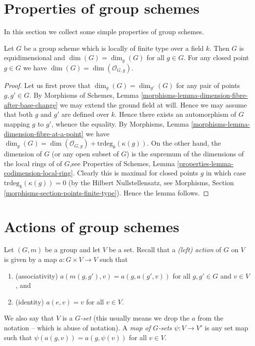 \section{Properties of group schemes}
\label{section-properties-group-schemes}

\noindent
In this section we collect some simple properties of group schemes.

\begin{lemma}
\label{lemma-group-scheme-finite-type-field}
Let $G$ be a group scheme which is locally of finite type over a
field $k$. Then $G$ is equidimensional and
$\dim(G) = \dim_g(G)$ for all $g \in G$.
For any closed point $g \in G$ we have $\dim(G) = \dim(\mathcal{O}_{G, g})$.
\end{lemma}

\begin{proof}
Let us first prove that $\dim_g(G) = \dim_{g'}(G)$ for any
pair of points $g, g' \in G$. By
Morphisms of Schemes,
Lemma \ref{morphisms-lemma-dimension-fibre-after-base-change}
we may extend the ground field at will. Hence we may assume that
both $g$ and $g'$ are defined over $k$. Hence there exists an
automorphism of $G$ mapping $g$ to $g'$, whence the equality.
By
Morphisms, Lemma \ref{morphisms-lemma-dimension-fibre-at-a-point}
we have
$\dim_g(G) = \dim(\mathcal{O}_{G, g}) +
\text{trdeg}_{k}(\kappa(g))$.
On the other hand, the dimension of $G$ (or any open subset of $G$)
is the supremum of the dimensions of the local rings of of $G$,see
Properties of Schemes, Lemma \ref{properties-lemma-codimension-local-ring}.
Clearly this is maximal for closed points $g$ in which case
$\text{trdeg}_{k}(\kappa(g)) = 0$ (by the Hilbert Nullstellensatz, see
Morphisms, Section \ref{morphisms-section-points-finite-type}).
Hence the lemma follows.
\end{proof}





\section{Actions of group schemes}
\label{section-action-group-scheme}

\noindent
Let $(G, m)$ be a group and let $V$ be a set.
Recall that a {\it (left) action} of $G$ on $V$ is given
by a map $a : G \times V \to V$ such that
\begin{enumerate}
\item (associativity) $a(m(g, g'), v) = a(g, a(g', v))$ for all
$g, g' \in G$ and $v \in V$, and
\item (identity) $a(e, v) = v$ for all $v \in V$.
\end{enumerate}
We also say that $V$ is a {\it $G$-set} (this usually means we
drop the $a$ from the notation -- which is abuse of notation).
A {\it map of $G$-sets} $\psi : V \to V'$ is any set map
such that $\psi(a(g, v)) = a(g, \psi(v))$ for all $v \in V$.

